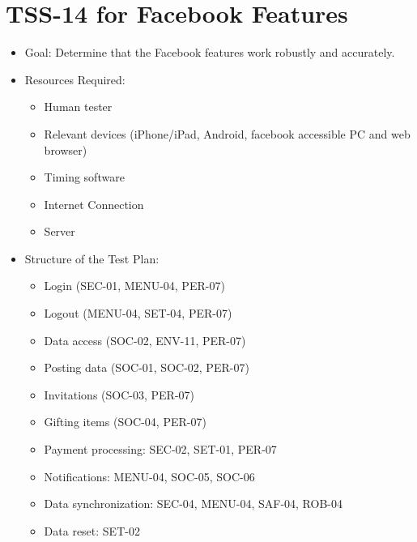 \section{TSS-14 for Facebook Features}
\begin{itemize}
\item Goal: Determine that the Facebook features work robustly and accurately.

\item Resources Required:
\begin{itemize}
\item Human tester
\item Relevant devices (iPhone/iPad, Android, facebook accessible PC and web browser)
\item Timing software
\item Internet Connection 
\item Server
\end{itemize}

\item Structure of the Test Plan: 
\begin{itemize}
\item Login (SEC-01, MENU-04, PER-07)
\item Logout (MENU-04, SET-04, PER-07)
\item Data access (SOC-02, ENV-11, PER-07)
\item Posting data (SOC-01, SOC-02, PER-07)
\item Invitations (SOC-03, PER-07)
\item Gifting items (SOC-04, PER-07)
\item Payment processing: SEC-02, SET-01, PER-07
\item Notifications: MENU-04, SOC-05, SOC-06
\item Data synchronization: SEC-04, MENU-04, SAF-04, ROB-04
\item Data reset: SET-02
\end{itemize}
\end{itemize}

